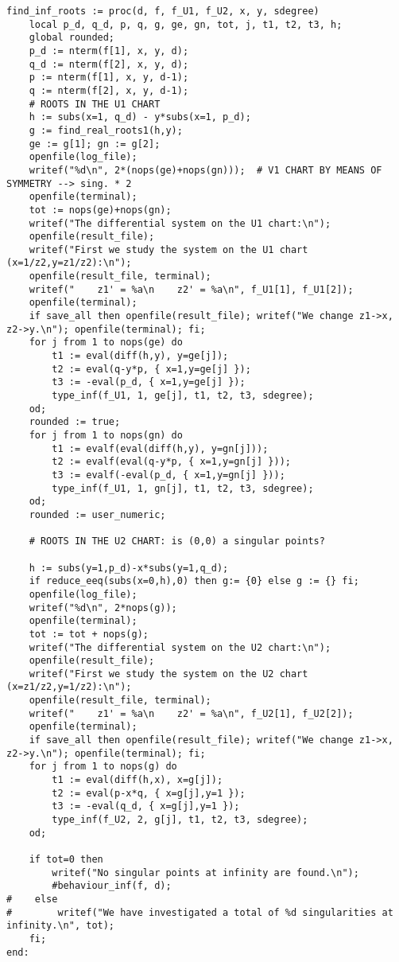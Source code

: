 \documentclass[a4paper,10pt]{article}
\begin{document}
\begin{lstlisting}[name=infinity]
find_inf_roots := proc(d, f, f_U1, f_U2, x, y, sdegree)
    local p_d, q_d, p, q, g, ge, gn, tot, j, t1, t2, t3, h;
    global rounded;
    p_d := nterm(f[1], x, y, d);
    q_d := nterm(f[2], x, y, d);
    p := nterm(f[1], x, y, d-1);
    q := nterm(f[2], x, y, d-1);
    # ROOTS IN THE U1 CHART
    h := subs(x=1, q_d) - y*subs(x=1, p_d);
    g := find_real_roots1(h,y);
    ge := g[1]; gn := g[2];
    openfile(log_file);
    writef("%d\n", 2*(nops(ge)+nops(gn)));  # V1 CHART BY MEANS OF SYMMETRY --> sing. * 2
    openfile(terminal);
    tot := nops(ge)+nops(gn);
    writef("The differential system on the U1 chart:\n");
    openfile(result_file);
    writef("First we study the system on the U1 chart (x=1/z2,y=z1/z2):\n");
    openfile(result_file, terminal);
    writef("    z1' = %a\n    z2' = %a\n", f_U1[1], f_U1[2]);
    openfile(terminal);
    if save_all then openfile(result_file); writef("We change z1->x, z2->y.\n"); openfile(terminal); fi;
    for j from 1 to nops(ge) do
        t1 := eval(diff(h,y), y=ge[j]);
        t2 := eval(q-y*p, { x=1,y=ge[j] });
        t3 := -eval(p_d, { x=1,y=ge[j] });
        type_inf(f_U1, 1, ge[j], t1, t2, t3, sdegree);
    od;
    rounded := true;
    for j from 1 to nops(gn) do
        t1 := evalf(eval(diff(h,y), y=gn[j]));
        t2 := evalf(eval(q-y*p, { x=1,y=gn[j] }));
        t3 := evalf(-eval(p_d, { x=1,y=gn[j] }));
        type_inf(f_U1, 1, gn[j], t1, t2, t3, sdegree);
    od;
    rounded := user_numeric;

    # ROOTS IN THE U2 CHART: is (0,0) a singular points?

    h := subs(y=1,p_d)-x*subs(y=1,q_d);
    if reduce_eeq(subs(x=0,h),0) then g:= {0} else g := {} fi;
    openfile(log_file);
    writef("%d\n", 2*nops(g));
    openfile(terminal);
    tot := tot + nops(g);
    writef("The differential system on the U2 chart:\n");
    openfile(result_file);
    writef("First we study the system on the U2 chart (x=z1/z2,y=1/z2):\n");
    openfile(result_file, terminal);
    writef("    z1' = %a\n    z2' = %a\n", f_U2[1], f_U2[2]);
    openfile(terminal);
    if save_all then openfile(result_file); writef("We change z1->x, z2->y.\n"); openfile(terminal); fi;
    for j from 1 to nops(g) do
        t1 := eval(diff(h,x), x=g[j]);
        t2 := eval(p-x*q, { x=g[j],y=1 });
        t3 := -eval(q_d, { x=g[j],y=1 });
        type_inf(f_U2, 2, g[j], t1, t2, t3, sdegree);
    od;

    if tot=0 then
        writef("No singular points at infinity are found.\n");
        #behaviour_inf(f, d);
#    else
#        writef("We have investigated a total of %d singularities at infinity.\n", tot);
    fi;
end:
\end{lstlisting}
\end{document}
